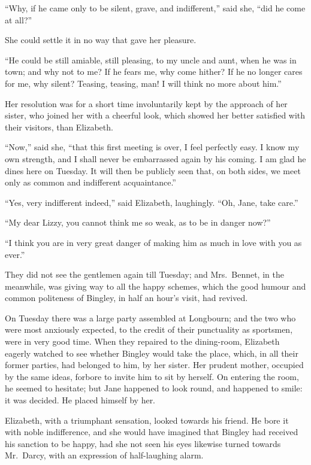 \documentclass[12pt,english]{book}
\begin{document}
{}``Why, if he came only to be silent, grave, and indifferent,''
said she, {}``did he come at all?''\ 

She could settle it in no way that gave her pleasure.

{}``He could be still amiable, still pleasing, to my uncle and aunt,
when he was in town; and why not to me? If he fears me, why come hither?
If he no longer cares for me, why silent? Teasing, teasing, man! I
will think no more about him.''

Her resolution was for a short time involuntarily kept by the approach
of her sister, who joined her with a cheerful look, which showed her
better satisfied with their visitors, than Elizabeth.

{}``Now,'' said she, {}``that this first meeting is over, I feel
perfectly easy. I know my own strength, and I shall never be embarrassed
again by his coming. I am glad he dines here on Tuesday. It will then
be publicly seen that, on both sides, we meet only as common and indifferent
acquaintance.''

{}``Yes, very indifferent indeed,'' said Elizabeth, laughingly.
{}``Oh, Jane, take care.''

{}``My dear Lizzy, you cannot think me so weak, as to be in danger
now?''\ 

{}``I think you are in very great danger of making him as much in
love with you as ever.''

\bigskip{} They did not see the gentlemen again till Tuesday; and
Mrs.\ Bennet, in the meanwhile, was giving way to all the happy schemes,
which the good humour and common politeness of Bingley, in half an
hour's visit, had revived.

On Tuesday there was a large party assembled at Longbourn; and the
two who were most anxiously expected, to the credit of their punctuality
as sportsmen, were in very good time. When they repaired to the dining-room,
Elizabeth eagerly watched to see whether Bingley would take the place,
which, in all their former parties, had belonged to him, by her sister.
Her prudent mother, occupied by the same ideas, forbore to invite
him to sit by herself. On entering the room, he seemed to hesitate;
but Jane happened to look round, and happened to smile: it was decided.
He placed himself by her.

Elizabeth, with a triumphant sensation, looked towards his friend.
He bore it with noble indifference, and she would have imagined that
Bingley had received his sanction to be happy, had she not seen his
eyes likewise turned towards Mr.\ Darcy, with an expression of half-laughing
alarm.
\end{document}
